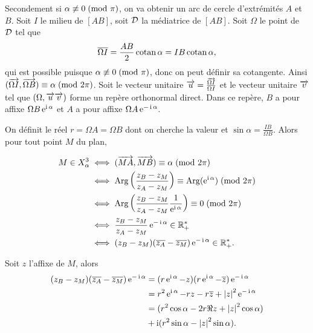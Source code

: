 Secondement si  \(\alpha \not\equiv 0\!\pmod {\pi}\), on va obtenir un arc de cercle 
d'extrémités \(A\) et \(B\). Soit \(I\) le milieu de \([AB]\), soit \(\mathcal{D}\) la 
médiatrice de \([AB]\). Soit \(\Omega\) le point de \(\mathcal{D}\) tel que
\begin{equation}
  \overline{\Omega I} = \frac{AB}{2}\operatorname{cotan} \alpha = IB \operatorname{cotan} \alpha,
\end{equation}
qui est possible puisque \(\alpha \not\equiv 0\!\pmod {\pi}\), donc on peut définir 
sa cotangente. Ainsi \((\overrightarrow{\Omega I},\overrightarrow{\Omega 
B}) \equiv \alpha\!\pmod {2\pi}\).  Soit le vecteur unitaire \(\overrightarrow{u} = \frac{\overrightarrow{\Omega 
I}}{\Omega I}\) et le vecteur unitaire \(\overrightarrow{v}\) tel que \((\Omega, \overrightarrow{u} \overrightarrow{v})\) 
forme un repère orthonormal direct. Dans ce repère, \(B\) a pour affixe 
\(\Omega B \operatorname{e}^{\operatorname{i} \alpha}\) et \(A\) a pour affixe \(\Omega A \operatorname{e}^{-\operatorname{i} 
\alpha}\).

On définit le réel \(r = \Omega A = \Omega B\) dont on cherche la valeur et 
\(\sin \alpha = \frac{IB}{\Omega B}\). Alors pour tout point \(M\) du plan,

\begin{align}
  M \in X_{\alpha}^3 & \iff (\overrightarrow{MA},\overrightarrow{MB}) \equiv \alpha\!\pmod {2\pi} \\
                     & \iff \operatorname{Arg}\left(\frac{z_B - z_M}{z_A - 
                     z_M}\right) \equiv \operatorname{Arg}(\operatorname{e}^{\operatorname{i} \alpha})\!\pmod {2\pi}\\
                     & \iff \operatorname{Arg}\left(\frac{z_B - z_M}{z_A - z_M} 
                     \frac{1}{\operatorname{e}^{\operatorname{i} \alpha}}\right) \equiv 0\!\pmod {2\pi}\\
                     & \iff \frac{z_B - z_M}{z_A - z_M} \operatorname{e}^{-\operatorname{i} \alpha} \in 
                     \mathbb{R}_{+}^{*}\\
                     & \iff (z_B - z_M)(\overline{z_A}-\overline{z_M})\operatorname{e}^{-\operatorname{i} \alpha} 
                     \in \mathbb{R}_{+}^{*}.
\end{align}

Soit \(z\) l'affixe de \(M\), alors
\begin{align}
  (z_B - z_M)(\overline{z_A}-\overline{z_M})\operatorname{e}^{-\operatorname{i} \alpha} & = (r\operatorname{e}^{\operatorname{i} \alpha} - 
  z)(r\operatorname{e}^{\operatorname{i} \alpha} - \overline{z})\operatorname{e}^{-\operatorname{i} \alpha} \\
                                                   & = r^2 \operatorname{e}^{\operatorname{i} \alpha} - 
                                                   rz - r\overline{z} + 
                                                   \left\lvert z\right\rvert^2\operatorname{e}^{-\operatorname{i} \alpha} 
                                                   \\
                                                   & = (r^2\cos \alpha - 
  2r\Re{z} + \left\lvert z\right\rvert^2\cos \alpha) \\ &+ \operatorname{i}(r^2\sin \alpha - \left\lvert z\right\rvert^2\sin 
  \alpha). \notag
\end{align}

